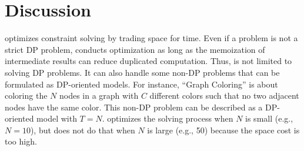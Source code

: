 \section{Discussion}

\tool optimizes constraint solving by trading space for time. Even if a problem is not a strict DP problem, 
\tool conducts optimization as long as the memoization of intermediate results can reduce duplicated computation. 
Thus, \tool is not limited to solving DP problems. It can also handle some non-DP problems that can be formulated as DP-oriented models. 
For instance, ``Graph Coloring'' is about coloring the $N$ nodes in a graph with $C$ different colors such that no two adjacent nodes have the same color. 
This non-DP problem can be described as a DP-oriented model with $T=N$. \tool optimizes the solving process when $N$ is small (e.g., $N=10$), but does not do that when $N$ is large (e.g., 50) because the space cost is too high. 







